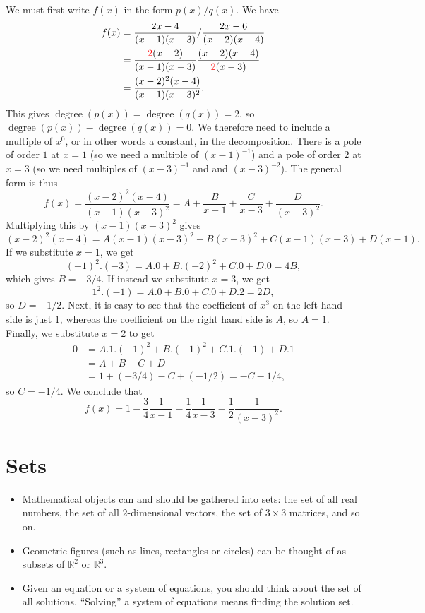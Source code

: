 \documentclass[a4paper]{book}
\newcommand{\RED}[1]{{\color{red}#1}}
\newcommand{\R}         {{\mathbb{R}}}
\newcommand{\tm}        {\times}
\newcommand{\degree}    {\operatorname{degree}}
\renewcommand{\:}{\colon}
\theoremstyle{definition}
\renewenvironment{solution}{\SolutionInline}{\endSolutionInline}
\begin{document}
\begin{solution}
 We must first write $f(x)$ in the form $p(x)/q(x)$.  We have 
 \begin{align*}
  f(x) &= \frac{2x-4}{(x-1)(x-3)} / \frac{2x-6}{(x-2)(x-4)} \\
       &= \frac{\RED{2}(x-2)}{(x-1)(x-3)}
          \frac{(x-2)(x-4)}{\RED{2}(x-3)} \\
       &= \frac{(x-2)^2(x-4)}{(x-1)(x-3)^2}.
 \end{align*}
 This gives $\degree(p(x))=\degree(q(x))=2$, so
 $\degree(p(x))-\degree(q(x))=0$.  We therefore need to include a
 multiple of $x^0$, or in other words a constant, in the
 decomposition.  There is a pole of order $1$ at $x=1$ (so we need a
 multiple of $(x-1)^{-1}$) and a pole of order $2$ at $x=3$ (so we
 need multiples of $(x-3)^{-1}$ and and $(x-3)^{-2}$).  The general
 form is thus
 \[ f(x)= \frac{(x-2)^2(x-4)}{(x-1)(x-3)^2} = 
    A + \frac{B}{x-1} + \frac{C}{x-3} + \frac{D}{(x-3)^2}.
 \]
 Multiplying this by $(x-1)(x-3)^2$ gives
 \[ (x-2)^2(x-4) = A(x-1)(x-3)^2 + B(x-3)^2 + C(x-1)(x-3) + D(x-1). \]
 If we substitute $x=1$, we get 
 \[ (-1)^2.(-3) = A.0 + B.(-2)^2 + C.0 + D.0 = 4B, \]
 which gives $B=-3/4$.  If instead we substitute $x=3$, we get 
 \[ 1^2.(-1) = A.0 + B.0 + C.0 + D.2 = 2D, \]
 so $D=-1/2$.  Next, it is easy to see that the coefficient of $x^3$
 on the left hand side is just $1$, whereas the coefficient on the
 right hand side is $A$, so $A=1$.  Finally, we substitute $x=2$ to
 get 
 \begin{align*}
   0 &= A.1.(-1)^2 + B.(-1)^2 + C.1.(-1) + D.1 \\
     &= A + B - C + D \\
     &= 1 + (-3/4) - C + (-1/2) = -C-1/4,
 \end{align*} 
 so $C=-1/4$.  We conclude that 
 \[ f(x) = 1 - \frac{3}{4}\frac{1}{x-1} 
             - \frac{1}{4}\frac{1}{x-3} 
             - \frac{1}{2}\frac{1}{(x-3)^2}.
 \] 
\end{solution}

\chapter{Sets}\label{chap-sets}

\begin{itemize}
 \item Mathematical objects can and should be gathered into sets:
  the set of all real numbers, the set of all $2$-dimensional vectors,
  the set of $3\tm 3$ matrices, and so on.
 \item Geometric figures (such as lines, rectangles or circles) can be
  thought of as subsets of $\R^2$ or $\R^3$.
 \item Given an equation or a system of equations, you should think
  about the set of all solutions.  ``Solving'' a system of equations
  means finding the solution set.
\end{itemize}
\end{document}
